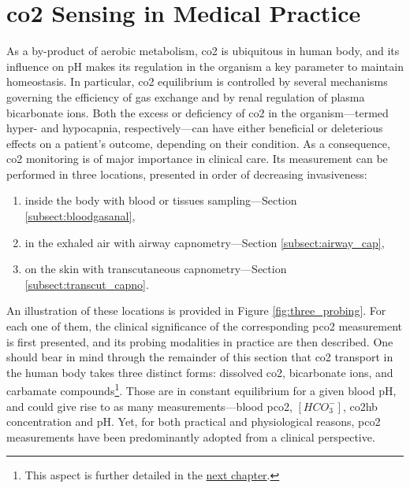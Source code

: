 \section{\texorpdfstring{\gls{co2}}{CO2} Sensing in Medical Practice}

As a by-product of aerobic metabolism, \gls{co2} is ubiquitous in human body, and its influence on pH makes its regulation in the organism a key parameter to maintain homeostasis\cite{jones2008}. In particular, \gls{co2} equilibrium is controlled by several mechanisms governing the efficiency of gas exchange\cite{guyenet2015, nunnschap5} and by renal regulation of plasma bicarbonate ions\cite{hamm2015}. Both the excess or deficiency of \gls{co2} in the organism---termed hyper- and hypocapnia, respectively---can have either beneficial or deleterious effects on a patient's outcome, depending on their condition\cite{curley2010}. As a consequence, \gls{co2} monitoring is of major importance in clinical care. Its measurement can be performed in three locations, presented in order of decreasing invasiveness:

\begin{enumerate}
	\item	inside the body with blood or tissues sampling---Section \ref{subsect:bloodgasanal},
	\item	in the exhaled air with airway capnometry---Section \ref{subsect:airway_cap},
	\item	on the skin with transcutaneous capnometry---Section \ref{subsect:transcut_capno}.
\end{enumerate}

An illustration of these locations is provided in Figure \ref{fig:three_probing}. For each one of them, the clinical significance of the corresponding \gls{pco2} measurement is first presented, and its probing modalities in practice are then described. One should bear in mind through the remainder of this section that \gls{co2} transport in the human body takes three distinct forms: dissolved \gls{co2}, bicarbonate ions, and carbamate compounds\footnote{This aspect is further detailed in the \hyperref[chap:co2hb]{next chapter}.}. Those are in constant equilibrium for a given blood pH, and could give rise to as many measurements---blood \gls{pco2}, $[HCO_3^-]$, \gls{co2hb} concentration and pH\cite{geers2000, nunns}. Yet, for both practical and physiological reasons, \gls{pco2} measurements have been predominantly adopted from a clinical perspective.

